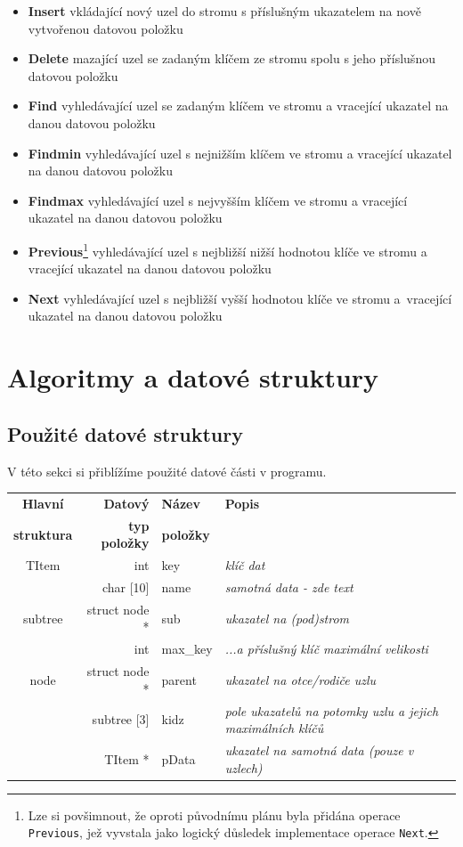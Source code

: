 \documentclass[11pt,a4paper]{article}
\begin{document}
\begin{itemize}
\item \textbf{Insert} vkládající nový uzel do stromu s příslušným ukazatelem na
nově vytvořenou datovou položku
\item \textbf{Delete} mazající uzel se zadaným klíčem ze stromu spolu s jeho
přísluš\-nou datovou položku
\item \textbf{Find} vyhledávající uzel se zadaným klíčem ve stromu a vracející
ukazatel na danou datovou položku
\item \textbf{Findmin} vyhledávající uzel s nejnižším klíčem ve stromu a vracející
ukazatel na danou datovou položku
\item \textbf{Findmax} vyhledávající uzel s nejvyšším klíčem ve stromu a vracející
ukazatel na danou datovou položku
\item \textbf{Previous}\footnote{Lze si povšimnout, že oproti původnímu plánu
byla přidána operace \verb~Previous~, jež vyvstala jako logický důsledek
implementace operace \verb~Next~.}
vyhledávající uzel s nejbližší nižší hodnotou klíče ve stromu a vracející
ukazatel na danou datovou položku
\item \textbf{Next} vyhledávající uzel s nejbližší vyšší hodnotou klíče ve
stromu a~vracející ukazatel na danou datovou položku
\end{itemize}

\section{Algoritmy a datové struktury}
\subsection{Použité datové struktury}
V této sekci si přiblížíme použité datové části v programu.

\begin{tabular}{ | c || r | l | p{4cm} | }
  \hline
  \textbf{Hlavní} & \textbf{Datový} & \textbf{Název} & \textbf{Popis} \\
  \textbf{struktura} & \textbf{typ položky} & \textbf{položky} & \\
  \hline \hline
  TItem & int & key & \textit{klíč dat} \\
  & char [10] & name & \textit{samotná data - zde text} \\ 
  \hline \hline
  subtree & struct node * & sub & \textit{ukazatel na (pod)strom} \\
  & int & max\_key & \textit{...a příslušný klíč maximální velikosti} \\ 
  \hline \hline
  node & struct node * & parent & \textit{ukazatel na otce/rodiče uzlu} \\
  & subtree [3] & kidz & \textit{pole ukazatelů na potomky uzlu a jejich maximálních klíčů} \\ 
  & TItem * & pData & \textit{ukazatel na samotná data (pouze v uzlech)} \\
  \hline
\end{tabular}
\end{document}

